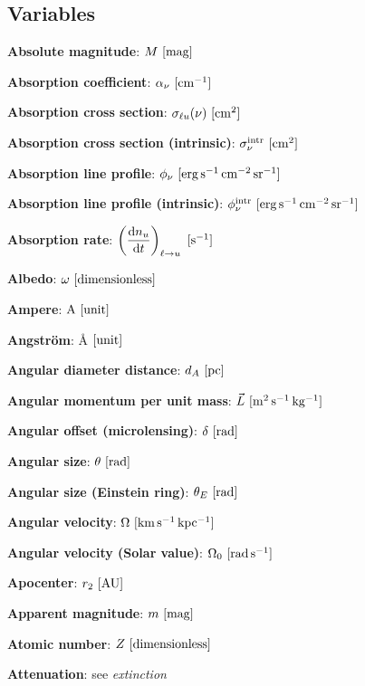 \documentclass[a4paper,10pt]{article}
\begin{document}
\newpage
\subsection{Variables}

{\noindent}\textbf{Absolute magnitude}: $M ~ [{\rm mag}]$

{\noindent}\textbf{Absorption coefficient}: $\alpha_\nu ~ [{\rm cm^{-1}}]$

{\noindent}\textbf{Absorption cross section}: $\sigma_{\ell u}(\nu) ~ [{\rm cm^{2}}]$

{\noindent}\textbf{Absorption cross section (intrinsic)}: $\sigma_\nu^{\rm intr} ~ [{\rm cm^{2}}]$

{\noindent}\textbf{Absorption line profile}: $\phi_\nu ~ [{\rm erg\,s^{-1}\,cm^{-2}\,sr^{-1}}]$

{\noindent}\textbf{Absorption line profile (intrinsic)}: $\phi_\nu^{\rm intr} ~ [{\rm erg\,s^{-1}\,cm^{-2}\,sr^{-1}}]$

{\noindent}\textbf{Absorption rate}: $\left(\dfrac{{\rm d}n_u}{{\rm d}t}\right)_{\ell\rightarrow u} ~ [{\rm s^{-1}}]$

{\noindent}\textbf{Albedo}: $\omega ~ [{\rm dimensionless}]$

{\noindent}\textbf{Ampere}: ${\rm A} ~ [{\rm unit}]$

{\noindent}\textbf{Angstr\"{o}m}: \AA$ ~ [{\rm unit}]$

{\noindent}\textbf{Angular diameter distance}: $d_A ~ [{\rm pc}]$

{\noindent}\textbf{Angular momentum per unit mass}: $\vec{L} ~ [{\rm m^2\,s^{-1}\,kg^{-1}}]$

{\noindent}\textbf{Angular offset (microlensing)}: $\delta ~ [{\rm rad}]$

{\noindent}\textbf{Angular size}: $\theta ~ [{\rm rad}]$

{\noindent}\textbf{Angular size (Einstein ring)}: $\theta_E ~ [{\rm rad}]$

{\noindent}\textbf{Angular velocity}: $\Omega ~ [{\rm km\,s^{-1}\,kpc^{-1}}]$

{\noindent}\textbf{Angular velocity (Solar value)}: $\Omega_0 ~ [{\rm rad\,s^{-1}}]$

{\noindent}\textbf{Apocenter}: $r_2 ~ [{\rm AU}]$

{\noindent}\textbf{Apparent magnitude}: $m ~ [{\rm mag}]$

{\noindent}\textbf{Atomic number}: $Z ~ [{\rm dimensionless}]$

{\noindent}\textbf{Attenuation}: see \textit{extinction}
\end{document}
